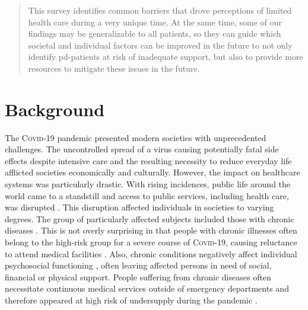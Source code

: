 \documentclass{bmcart}
\begin{document}
\begin{frontmatter}
\begin{abstractbox}
\begin{abstract}
This survey identifies common barriers that drove perceptions of limited health care during a very unique time. At the same time, some of our findings may be generalizable to all patients, so they can guide which societal and individual factors can be improved in the future to not only identify \ac{pd}-patients at risk of inadequate support, but also to provide more resources to mitigate these issues in the future.

\end{abstract}


\begin{keyword}%
\end{keyword}

\end{abstractbox}

\end{frontmatter}


\section*{Background}
The \textsc{Covid}-19 pandemic presented modern societies with unprecedented challenges. The uncontrolled spread of a virus causing potentially fatal side effects despite intensive care and the resulting necessity to reduce everyday life afflicted societies economically and culturally. However, the impact on healthcare systems was particularly drastic. With rising incidences, public life around the world came to a standstill and access to public services, including health care, was disrupted \cite{nunez2021access, moynihan2021impact, world2020impact}. This disruption affected individuals in societies to varying degrees. The group of particularly affected subjects included those with chronic diseases \cite{sepulveda2020impact, kasar2021life, yogev2021covid, scheidt2021care}. This is not overly surprising in that people with chronic illnesses often belong to the high-risk group for a severe course of \textsc{Covid}-19, causing reluctance to attend medical facilities \cite{feral2020collateral}. Also, chronic conditions negatively affect individual psychosocial functioning \cite{demirtepe2022psychosocial}, often leaving affected persons in need of social, financial or physical support. People suffering from chronic diseases often necessitate continuous medical services outside of emergency departments and therefore appeared at high risk of undersupply during the pandemic \cite{scheidt2021care, nunez2021access, world2020impact}. 
\end{document}
